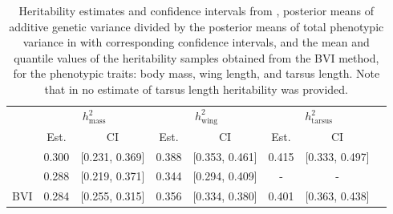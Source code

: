 \begin{table}[H]
  \centering
  \small
  \begin{tabular}{lccccccc}
    \toprule
    & \multicolumn{2}{c}{$h^2_{\text{mass}}$} & \multicolumn{2}{c}{$h^2_{\text{wing}}$} & \multicolumn{2}{c}{$h^2_{\text{tarsus}}$} \\
    \cmidrule(lr){2-3} \cmidrule(lr){4-5} \cmidrule(lr){6-7}
    & Est. & CI & Est. & CI & Est. & CI \\
    \midrule
    \citet{Silva2017} & 0.300 & [0.231, 0.369] & 0.388 & [0.353, 0.461] & 0.415 & [0.333, 0.497] \\
    \citet{Muff2019Genetic} & 0.288 & [0.219, 0.371] & 0.344 & [0.294, 0.409] & - & - \\
    BVI & 0.284 & [0.255, 0.315] & 0.356 & [0.334, 0.380] & 0.401 & [0.363, 0.438] \\
    \bottomrule
  \end{tabular}
  \caption[Heritability estimates and confidence intervals]{Heritability estimates and confidence intervals from \citet{Silva2017}, posterior means of additive genetic variance divided by the posterior means of total phenotypic variance in \citet{Muff2019Genetic} with corresponding confidence intervals, and the mean and quantile values of the heritability samples obtained from the BVI method, for the phenotypic traits: body mass, wing length, and tarsus length. Note that in \citet{Muff2019Genetic} no estimate of tarsus length heritability was provided.}
  \label{table:summary_heritability}
\end{table}
